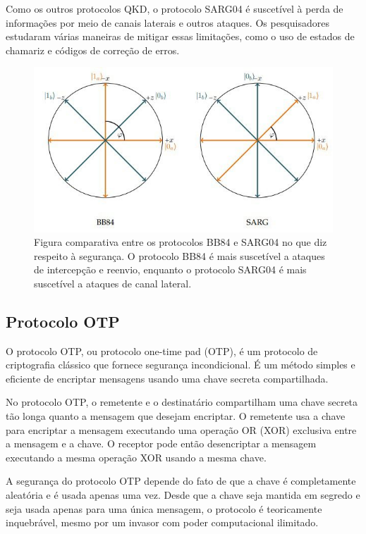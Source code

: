 Como os outros protocolos QKD, o protocolo SARG04 é suscetível à perda de informações por meio de canais laterais e outros ataques. Os pesquisadores estudaram várias maneiras de mitigar essas limitações, como o uso de estados de chamariz e códigos de correção de erros.

\begin{figure}[!hbt]
  \centering
  \includegraphics[width=\textwidth]{images/bb84-vs-sarg04.jpg}
  \caption{Figura comparativa entre os protocolos BB84 e SARG04 no que diz respeito à segurança. O protocolo BB84 é mais suscetível a ataques de intercepção e reenvio, enquanto o protocolo SARG04 é mais suscetível a ataques de canal lateral.}
  \label{fig:bb84-vs-sarg04}
\end{figure}
\FloatBarrier

\subsection{Protocolo OTP}

O protocolo OTP, ou protocolo one-time pad (OTP), é um protocolo de criptografia clássico que fornece segurança incondicional. É um método simples e eficiente de encriptar mensagens usando uma chave secreta compartilhada.

No protocolo OTP, o remetente e o destinatário compartilham uma chave secreta tão longa quanto a mensagem que desejam encriptar. O remetente usa a chave para encriptar a mensagem executando uma operação OR (XOR) exclusiva entre a mensagem e a chave. O receptor pode então desencriptar a mensagem executando a mesma operação XOR usando a mesma chave.

A segurança do protocolo OTP depende do fato de que a chave é completamente aleatória e é usada apenas uma vez. Desde que a chave seja mantida em segredo e seja usada apenas para uma única mensagem, o protocolo é teoricamente inquebrável, mesmo por um invasor com poder computacional ilimitado.

